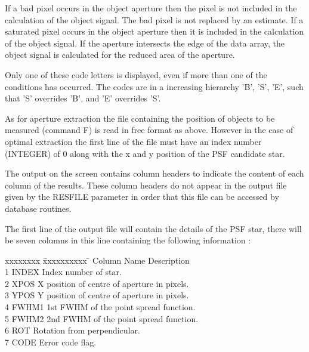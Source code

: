 \documentclass[twoside,11pt,nolof]{starlink}
\begin{document}
{{   If a bad pixel occurs in the object aperture then the pixel is not
   included in the calculation of the object signal. The bad pixel is not
   replaced by an estimate. If a saturated pixel occurs in the object
   aperture then it is included in the calculation of the object signal.
   If the aperture intersects the edge of the data array, the object signal
   is calculated for the reduced area of the aperture.

   Only one of these code letters is displayed, even if more than one of the
   conditions has occurred. The codes are in a increasing hierarchy 'B', 'S',
   'E', such that 'S' overrides 'B', and 'E' overrides 'S'.
   }

    {

   As for aperture extraction the file containing the position of objects
   to be measured (command F) is read in free format as above. However in
   the case of optimal extraction the first line of the file must have an
   index number (INTEGER) of 0 along with the x and y position of the PSF
   candidate star.

   The output on the screen contains column headers to indicate the content of
   each column of the results. These column headers do not appear in the
   output file given by the RESFILE parameter in order that this file can be
   accessed by database routines.

   The first line of the output file will contain the details of the PSF star,
   there will be seven columns in this line containing the following information :

   \begin{tabbing}
   xxxxxxxx \= xxxxxxxxxx \= \kill
   Column \> Name  \> Description \\
    1 \> INDEX \> Index number of star.\\
    2 \> XPOS \> X position of centre of aperture in pixels.\\
    3 \> YPOS \> Y position of centre of aperture in pixels.\\
    4 \> FWHM1 \> 1st FWHM of the point spread function.\\
    5 \> FWHM2 \> 2nd FWHM of the point spread function.\\
    6 \> ROT \> Rotation from perpendicular.\\
    7 \> CODE \> Error code flag.\\
   \end{tabbing}

}}
\end{document}
